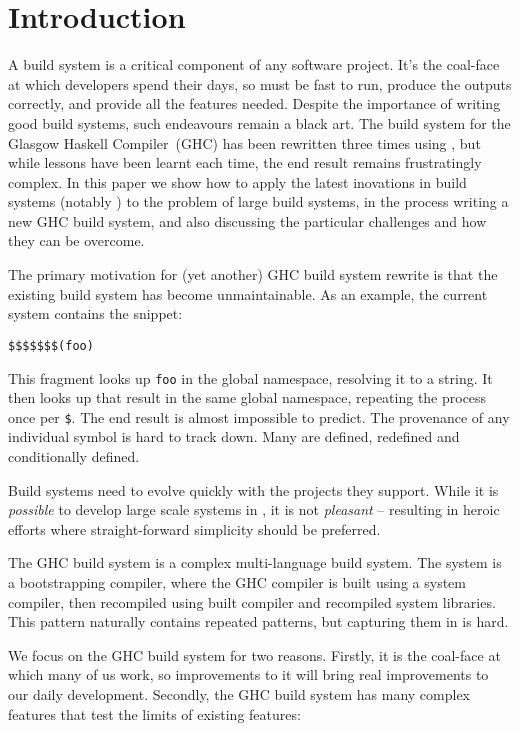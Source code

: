 \section{Introduction}

A build system is a critical component of any software project. It's the coal-face at which developers spend their days, so must be fast to run, produce the outputs correctly, and provide all the features needed. Despite the importance of writing good build systems, such endeavours remain a black art. The build system for the Glasgow Haskell Compiler~(GHC) \cite{ghc} has been rewritten three times using \make{} \cite{make}, but while lessons have been learnt each time, the end result remains frustratingly complex. In this paper we show how to apply the latest inovations in build systems (notably \citet{shake}) to the problem of large build systems, in the process writing a new GHC build system, and also discussing the particular challenges and how they can be overcome.

The primary motivation for (yet another) GHC build system rewrite is that the existing build system has become unmaintainable. As an example, the current system contains the snippet:

\begin{verbatim}
$$$$$$$(foo)
\end{verbatim}

This fragment looks up \texttt{foo} in the global namespace, resolving it to a string. It then looks up that result in the same global namespace, repeating the process once per \verb"$". The end result is almost impossible to predict. The provenance of any individual symbol is hard to track down. Many are defined, redefined and conditionally defined.

Build systems need to evolve quickly with the projects they support. While it is \textit{possible} to develop large scale systems in \make, it is not \textit{pleasant} -- resulting in heroic efforts where straight-forward simplicity should be preferred.

The GHC build system is a complex multi-language build system. The system is a bootstrapping compiler, where the GHC compiler is built using a system compiler, then recompiled using built compiler and recompiled system libraries. This pattern naturally contains repeated patterns, but capturing them in \make is hard.

We focus on the GHC build system for two reasons. Firstly, it is the coal-face at which many of us work, so improvements to it will bring real improvements to our daily development. Secondly, the GHC build system has many complex features that test the limits of existing features:

